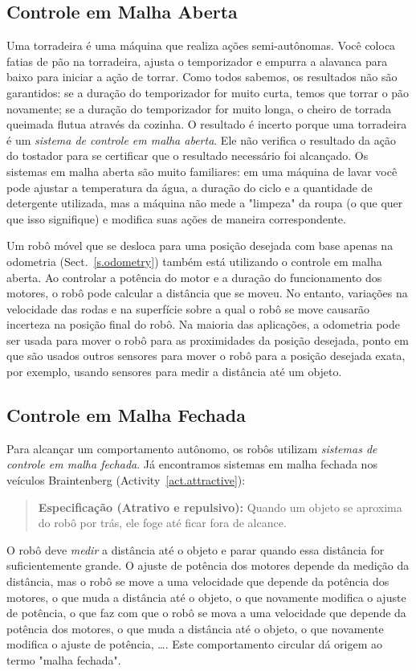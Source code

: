 \subsection{Controle em Malha Aberta}

Uma torradeira é uma máquina que realiza ações semi-autônomas. Você coloca fatias de pão na torradeira, ajusta o temporizador e empurra a alavanca para baixo para iniciar a ação de torrar. Como todos sabemos, os resultados não são garantidos: se a duração do temporizador for muito curta, temos que torrar o pão novamente; se a duração do temporizador for muito longa, o cheiro de torrada queimada flutua através da cozinha. O resultado é incerto porque uma torradeira é um \emph{sistema de controle em malha aberta}. Ele não verifica o resultado da ação do tostador para se certificar que o resultado necessário foi alcançado. Os sistemas em malha aberta são muito familiares: em uma máquina de lavar você pode ajustar a temperatura da água, a duração do ciclo e a quantidade de detergente utilizada, mas a máquina não mede a "limpeza" da roupa (o que quer que isso signifique) e modifica suas ações de maneira correspondente.

Um robô móvel que se desloca para uma posição desejada com base apenas na odometria (Sect.~\ref{s.odometry}) também está utilizando o controle em malha aberta. Ao controlar a potência do motor e a duração do funcionamento dos motores, o robô pode calcular a distância que se moveu. No entanto, variações na velocidade das rodas e na superfície sobre a qual o robô se move causarão incerteza na posição final do robô. Na maioria das aplicações, a odometria pode ser usada para mover o robô para as proximidades da posição desejada, ponto em que são usados outros sensores para mover o robô para a posição desejada exata, por exemplo, usando sensores para medir a distância até um objeto.

\subsection{Controle em Malha Fechada}

Para alcançar um comportamento autônomo, os robôs utilizam \emph{sistemas de controle em malha fechada}. Já encontramos sistemas em malha fechada nos veículos Braintenberg (Activity~\ref{act.attractive}):
\begin{quote}
\normalsize\noindent\textbf{Especificação (Atrativo e repulsivo):} Quando um objeto se aproxima do robô por trás, ele foge até ficar fora de alcance.
\end{quote}
O robô deve \emph{medir} a distância até o objeto e parar quando essa distância for suficientemente grande. O ajuste de potência dos motores depende da medição da distância, mas o robô se move a uma velocidade que depende da potência dos motores, o que muda a distância até o objeto, o que novamente modifica o ajuste de potência, o que faz com que o robô se mova a uma velocidade que depende da potência dos motores, o que muda a distância até o objeto, o que novamente modifica o ajuste de potência, \ldots. Este comportamento circular dá origem ao termo "malha fechada".

